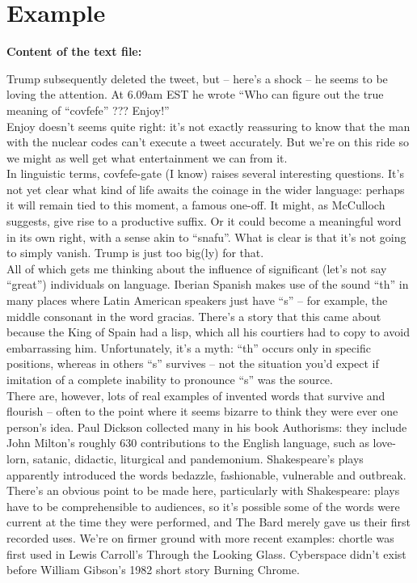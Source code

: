 \documentclass[12pt]{article}
\begin{document}
\section{Example}%
\label{sec:example}

\textbf{Content of the text file:}

Trump subsequently deleted the tweet, but – here’s a shock – he seems to be loving the attention. At 6.09am EST he wrote “Who can figure out the true meaning of “covfefe” ??? Enjoy!”\\

Enjoy doesn’t seems quite right: it’s not exactly reassuring to know that the man with the nuclear codes can’t execute a tweet accurately. But we’re on this ride so we might as well get what entertainment we can from it.\\

In linguistic terms, covfefe-gate (I know) raises several interesting questions. It’s not yet clear what kind of life awaits the coinage in the wider language: perhaps it will remain tied to this moment, a famous one-off. It might, as McCulloch suggests, give rise to a productive suffix. Or it could become a meaningful word in its own right, with a sense akin to “snafu”. What is clear is that it’s not going to simply vanish. Trump is just too big(ly) for that.   \\

All of which gets me thinking about the influence of significant (let’s not say “great”) individuals on language. Iberian Spanish makes use of the sound “th” in many places where Latin American speakers just have “s” – for example, the middle consonant in the word gracias. There’s a story that this came about because the King of Spain had a lisp, which all his courtiers had to copy to avoid embarrassing him. Unfortunately, it’s a myth: “th” occurs only in specific positions, whereas in others “s” survives – not the situation you’d expect if imitation of a complete inability to pronounce “s” was the source.\\

There are, however, lots of real examples of invented words that survive and flourish – often to the point where it seems bizarre to think they were ever one person’s idea. Paul Dickson collected many in his book Authorisms: they include John Milton’s roughly 630 contributions to the English language, such as love-lorn, satanic, didactic, liturgical and pandemonium. Shakespeare’s plays apparently introduced the words bedazzle, fashionable, vulnerable and outbreak. There’s an obvious point to be made here, particularly with Shakespeare: plays have to be comprehensible to audiences, so it’s possible some of the words were current at the time they were performed, and The Bard merely gave us their first recorded uses. We’re on firmer ground with more recent examples: chortle was first used in Lewis Carroll’s Through the Looking Glass. Cyberspace didn’t exist before William Gibson’s 1982 short story Burning Chrome.  \\
\end{document}
